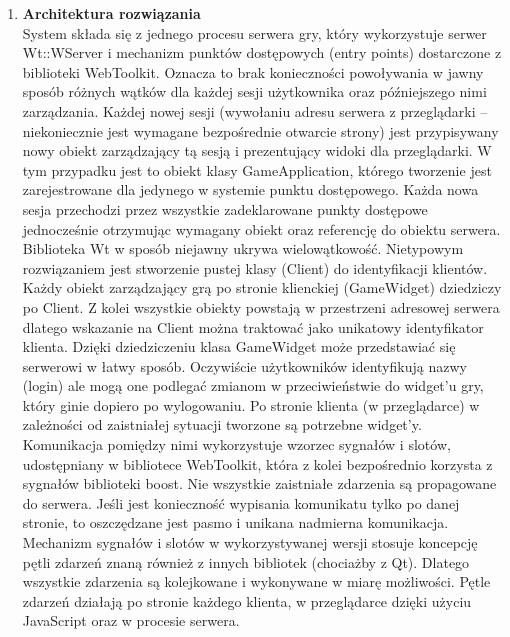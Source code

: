 \documentclass{report}
\begin{document}
\begin{enumerate}
\item \textbf{Architektura rozwiązania } \\
System składa się z jednego procesu serwera gry, który wykorzystuje serwer Wt::WServer i mechanizm punktów dostępowych (entry points) dostarczone z biblioteki WebToolkit. 
Oznacza to brak konieczności powoływania w jawny sposób różnych wątków dla każdej sesji użytkownika oraz późniejszego nimi zarządzania. Każdej nowej sesji (wywołaniu adresu serwera z przeglądarki – niekoniecznie jest wymagane bezpośrednie otwarcie strony) jest przypisywany nowy obiekt zarządzający tą sesją i prezentujący widoki dla przeglądarki. W tym przypadku jest to obiekt klasy GameApplication, którego tworzenie jest zarejestrowane dla jedynego w systemie punktu dostępowego. Każda nowa sesja przechodzi przez wszystkie zadeklarowane punkty dostępowe jednocześnie otrzymując wymagany obiekt oraz referencję do obiektu serwera. Biblioteka Wt w sposób niejawny ukrywa wielowątkowość.
Nietypowym rozwiązaniem jest stworzenie pustej klasy (Client) do identyfikacji klientów. Każdy obiekt zarządzający grą po stronie klienckiej (GameWidget) dziedziczy po Client. Z kolei wszystkie obiekty powstają w przestrzeni adresowej serwera dlatego wskazanie na Client można traktować jako unikatowy identyfikator klienta. Dzięki dziedziczeniu klasa GameWidget może przedstawiać się serwerowi w łatwy sposób. Oczywiście użytkowników identyfikują nazwy (login) ale mogą one podlegać zmianom w przeciwieństwie do widget’u gry, który ginie dopiero po wylogowaniu.
Po stronie klienta (w przeglądarce) w zależności od zaistniałej sytuacji tworzone są potrzebne widget’y. Komunikacja pomiędzy nimi wykorzystuje wzorzec sygnałów i slotów, udostępniany w bibliotece WebToolkit, która z kolei bezpośrednio korzysta z sygnałów biblioteki boost. Nie wszystkie zaistniałe zdarzenia są propagowane do serwera. Jeśli jest konieczność wypisania komunikatu tylko po danej stronie, to oszczędzane jest pasmo i unikana nadmierna komunikacja. Mechanizm sygnałów i slotów w wykorzystywanej wersji stosuje koncepcję pętli zdarzeń znaną również z innych bibliotek (chociażby z Qt). Dlatego wszystkie zdarzenia są kolejkowane i wykonywane w miarę możliwości. Pętle zdarzeń działają po stronie każdego klienta, w przeglądarce dzięki użyciu JavaScript oraz w procesie serwera.


\end{enumerate}
\end{document}
